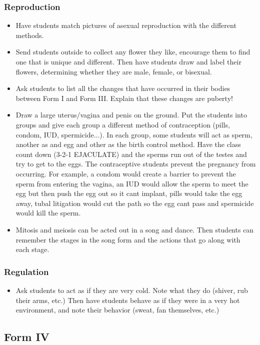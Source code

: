 \subsubsection{Reproduction}
\begin{itemize}
\item Have students match pictures of asexual reproduction with the different methods.
\item Send students outside to collect any flower they like, encourage them to find one that is unique and different. Then have students draw and label their flowers, determining whether they are male, female, or bisexual.
\item Ask students to list all the changes that have occurred in their bodies between Form I and Form III. Explain that these changes are puberty!
\item Draw a large uterus/vagina and penis on the ground. Put the students into groups and give each group a different method of contraception (pills, condom, IUD, spermicide...). In each group, some students will act as sperm, another as and egg and other as the birth control method. Have the class count down (3-2-1 EJACULATE) and the sperms run out of the testes and try to get to the eggs. The contraceptive students prevent the pregnancy from occurring. For example, a condom would create a barrier to prevent the sperm from entering the vagina, an IUD would allow the sperm to meet the egg but then push the egg out so it cant implant, pills would take the egg away, tubal litigation would cut the path so the egg cant pass and spermicide would kill the sperm.
\item Mitosis and meiosis can be acted out in a song and dance. Then students can remember the stages in the song form and the actions that go along with each stage.
\end{itemize}

\subsubsection{Regulation}
\begin{itemize}
\item Ask students to act as if they are very cold.  Note what they do (shiver, rub their arms, etc.) Then have students behave as if they were in a very hot environment, and note their behavior (sweat, fan themselves, etc.) 
\end{itemize}

\subsection{Form IV}
